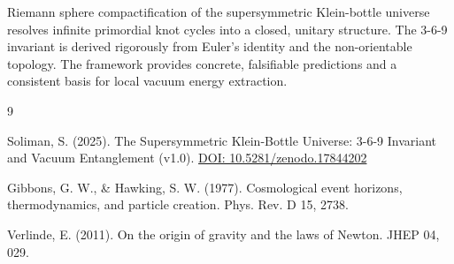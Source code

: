\documentclass[11pt,a4paper]{article}
\begin{document}
Riemann sphere compactification of the supersymmetric Klein-bottle universe resolves infinite primordial knot cycles into a closed, unitary structure. The 3-6-9 invariant is derived rigorously from Euler's identity and the non-orientable topology. The framework provides concrete, falsifiable predictions and a consistent basis for local vacuum energy extraction.

\begin{thebibliography}{9}

Soliman, S. (2025). 
The Supersymmetric Klein-Bottle Universe: 3-6-9 Invariant and Vacuum Entanglement (v1.0). 
\href{https://doi.org/10.5281/zenodo.17844202}{DOI: 10.5281/zenodo.17844202}

Gibbons, G. W., \& Hawking, S. W. (1977). 
Cosmological event horizons, thermodynamics, and particle creation. 
Phys. Rev. D 15, 2738.

Verlinde, E. (2011). 
On the origin of gravity and the laws of Newton. 
JHEP 04, 029.

\end{thebibliography}
\end{document}
